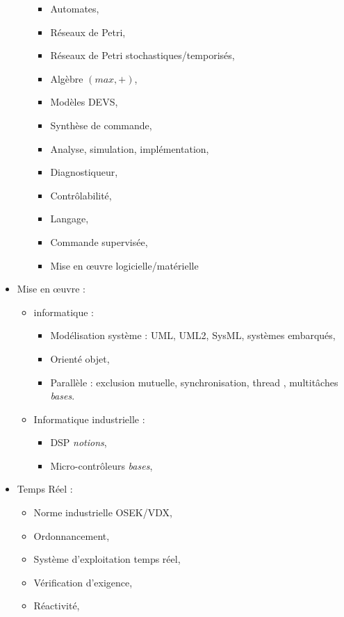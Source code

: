\documentclass{article}
\begin{document}
\begin{itemize}
\begin{itemize}
\begin{itemize}
		\item Automates, 
		\item Réseaux de Petri, 
		\item Réseaux de Petri stochastiques/temporisés, 
		\item Algèbre $(max,+)$,
		\item Modèles DEVS,
		\item Synthèse de commande, 
		\item Analyse, simulation, implémentation, 
		\item Diagnostiqueur, 
		\item Contrôlabilité,
		\item Langage, 
		\item Commande supervisée,
		\item Mise en \oe uvre logicielle/matérielle
		\end{itemize}
	\end{itemize}
	
	
\item Mise en \oe uvre :
\begin{itemize}
\item informatique : %
	\begin{itemize}
	\item Modélisation système : UML, UML2, SysML, systèmes embarqués,
	\item Orienté objet,
	\item Parallèle : exclusion mutuelle, synchronisation, thread , multitâches \textit{bases}.
	\end{itemize}
	
\item Informatique industrielle :
	\begin{itemize}
	\item DSP \textit{notions},
	\item Micro-contrôleurs \textit{bases},
	\end{itemize}
\end{itemize}	
	
	
	
\item Temps Réel : 
	\begin{itemize}
	\item Norme industrielle OSEK/VDX,
	\item Ordonnancement, 
	\item Système d'exploitation temps réel,
	\item Vérification d’exigence, 
	\item Réactivité,
	\end{itemize}	
	

\end{itemize}
\end{document}
